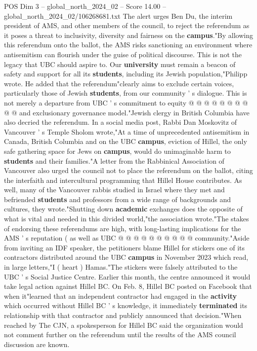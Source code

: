 \begin{textsample}{POS Dim 3 – global\_north\_2024\_02 – Score 14.00 – global\_north\_2024\_02/106268681.txt}
The alert urges Ben Du, the interim president of AMS, and other members of the council, to reject the referendum as it poses a threat to inclusivity, diversity and fairness on the \textbf{campus}."By allowing this referendum onto the ballot, the AMS risks sanctioning an environment where antisemitism can flourish under the guise of political discourse.
This is not the legacy that UBC should aspire to.
Our \textbf{university} must remain a beacon of safety and support for all its \textbf{students}, including its Jewish population,"Philipp wrote.
He added that the referendum"clearly aims to exclude certain voices, particularly those of Jewish \textbf{students}, from our community ' s dialogue.
This is not merely a departure from UBC ' s commitment to equity @ @ @ @ @ @ @ @ @ @ and exclusionary governance model."Jewish clergy in British Columbia have also decried the referendum.
In a social media post, Rabbi Dan Moskovitz of Vancouver ' s Temple Sholom wrote,"At a time of unprecedented antisemitism in Canada, British Columbia and on the UBC \textbf{campus}, eviction of Hillel, the only safe gathering space for Jews on \textbf{campus}, would do unimaginable harm to \textbf{students} and their families."A letter from the Rabbinical Association of Vancouver also urged the council not to place the referendum on the ballot, citing the interfaith and intercultural programming that Hillel House contributes.
As well, many of the Vancouver rabbis studied in Israel where they met and befriended \textbf{students} and professors from a wide range of backgrounds and cultures, they wrote."Shutting down \textbf{academic} exchanges does the opposite of what is vital and needed in this divided world,"the association wrote."The stakes of endorsing these referendums are high, with long-lasting implications for the AMS ' s reputation ( as well as UBC @ @ @ @ @ @ @ @ @ @ community."Aside from inviting an IDF speaker, the petitioners blame Hillel for stickers one of its contractors distributed around the UBC \textbf{campus} in November 2023 which read, in large letters,"I ( heart ) Hamas."The stickers were falsely attributed to the UBC ' s Social Justice Centre.
Earlier this month, the centre announced it would take legal action against Hillel BC.
On Feb. 8, Hillel BC posted on Facebook that when it"learned that an independent contractor had engaged in the \textbf{activity} which occurred without Hillel BC ' s knowledge, it immediately \textbf{terminated} its relationship with that contractor and publicly announced that decision."When reached by The CJN, a spokesperson for Hillel BC said the organization would not comment further on the referendum until the results of the AMS council discussion are known.

\end{textsample}
